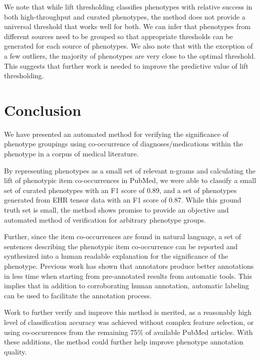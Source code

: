 \documentclass{sig-alternate-05-2015}
\begin{document}
We note that while lift thresholding classifies phenotypes with relative success in both high-throughput and curated phenotypes, the method does not provide a universal threshold that works well for both. We can infer that phenotypes from different sources need to be grouped so that appropriate thresholds can be generated for each source of phenotypes. We also note that with the exception of a few outliers, the majority of phenotypes are very close to the optimal threshold. This suggests that further work is needed to improve the predictive value of lift thresholding.

\section{Conclusion}
We have presented an automated method for verifying the significance of phenotype groupings using co-occurrence of diagnoses/medications within the phenotype in a corpus of medical literature. 

By representing phenotypes as a small set of relevant n-grams and calculating the lift of phenotypic item co-occurrences in PubMed, we were able to classify a small set of curated phenotypes with an F1 score of 0.89, and a set of phenotypes generated from EHR tensor data with an F1 score of 0.87. While this ground truth set is small, the method shows promise to provide an objective and automated method of verification for arbitrary phenotype groups. 

Further, since the item co-occurrences are found in natural language, a set of sentences describing the phenotypic item co-occurrence can be reported and synthesized into a human readable explanation for the significance of the phenotype. Previous work \cite{neveol2011semi} has shown that annotators produce better annotations in less time when starting from pre-annotated results from automatic tools. This implies that in addition to corroborating human annotation, automatic labeling can be used to facilitate the annotation process. 

Work to further verify and improve this method is merited, as a reasonably high level of classification accuracy was achieved without complex feature selection, or using co-occurrences from the remaining 75\% of available PubMed articles. With these additions, the method could further help improve phenotype annotation quality. 



%
%
%


\end{document}
